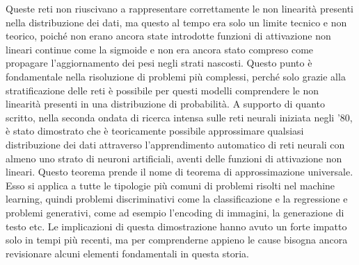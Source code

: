 Queste reti non riuscivano a rappresentare correttamente le non linearità presenti nella distribuzione dei dati, ma questo al tempo era solo un limite tecnico e non teorico, poiché non erano ancora state introdotte funzioni di attivazione non lineari continue come la sigmoide e non era ancora stato compreso come propagare l'aggiornamento dei pesi negli strati nascosti. Questo punto è fondamentale nella risoluzione di problemi più complessi, perché solo grazie alla stratificazione delle reti è possibile per questi modelli comprendere le non linearità presenti in una distribuzione di probabilità. A supporto di quanto scritto, nella seconda ondata di ricerca intensa sulle reti neurali iniziata negli '80, è stato dimostrato che è teoricamente possibile approssimare qualsiasi distribuzione dei dati attraverso l'apprendimento automatico di reti neurali con almeno uno strato di neuroni artificiali, aventi delle funzioni di attivazione non lineari. Questo teorema prende il nome di teorema di approssimazione universale. Esso si applica a tutte le tipologie più comuni di problemi risolti nel machine learning, quindi problemi discriminativi come la classificazione e la regressione e problemi generativi, come ad esempio l'encoding di immagini, la generazione di testo etc. Le implicazioni di questa dimostrazione hanno avuto un forte impatto solo in tempi più recenti, ma per comprenderne appieno le cause bisogna ancora revisionare alcuni elementi fondamentali in questa storia.


